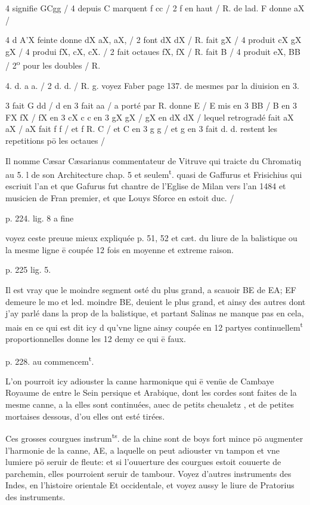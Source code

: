 \documentclass[11pt,a4paper]{article}
\begin{document}
4 signifie GCgg / 4 depuis C marquent f cc / 2 f en haut / R. de lad. F donne aX /

4 d A'X feinte donne dX aX, aX, / 2 font dX dX / R. fait gX / 4 produit cX gX gX / 4 produi fX, cX, cX. / 2 fait octaues fX, fX / R. fait B / 4 produit eX, BB / 2\textsuperscript{o} pour les doubles / R. \ill{}

4. d. a a. / 2 d. d. / R. g. voyez Faber page 137. de mesmes par la diuision en 3.

3 fait G dd / d en 3 fait aa / a porté par R. donne E / E mis en 3 BB / B en 3 FX fX / fX en 3 cX c\ill{} c en 3 gX gX / gX en  dX dX / lequel retrogradé fait aX aX / aX fait f f / et f R. C / et C en 3 g g / et g en 3 fait d. d. restent les repetitions pō les octaues /

Il nomme Cæsar Cæsarianus commentateur de Vitruve qui traicte du Chromatiq au 5. l de son Architecture chap. 5 et  seulem\textsuperscript{t}. quasi de Gaffurus et Frisichius qui escriuit l'an \ill{} et que Gafurus fut chantre de l'Eglise de Milan vers l'an 1484 et musicien de Fran\ill{} premier, et que Louys Sforce en estoit duc. /

p. 224. lig. 8 a fine

voyez ceste preuue mieux expliquée p. 51, 52 et cæt. du liure de la balistique ou la mesme ligne ē coupée 12 fois en moyenne et extreme raison.

p. 225 lig. 5.

Il est vray que le moindre segment osté du plus grand, a scauoir BE de EA; EF demeure le mo\ill{} et led. moindre BE, deuient le plus grand, et ainsy des autres dont j'ay parlé dans la prop\ill{} de la balistique, et partant Salinas ne manque pas en cela, mais en ce qui est dit icy d\ill{} qu'vne ligne ainsy coupée en 12 partyes continuellem\textsuperscript{t} proportionnelles donne les 12 demy\ill{} ce qui ē faux.

p. 228. au commencem\textsuperscript{t}.

L'on pourroit icy adiouster la canne harmonique qui ē venüe de Cambaye Royaume de \ill{} entre le Sein persique et Arabique, dont les cordes sont faites de la mesme canne, a la\ill{} elles sont continuées, auec de petits cheualetz \ill{}, et de petites mortaises dessous, d'ou elles ont esté tirées.

Ces grosses courgues instrum\textsuperscript{ts}. de la chine sont de boys fort mince pō augmenter l'harmonie de la canne, AE, a laquelle on peut adiouster vn tampon et vne lumiere pō seruir de fleute: et si l'ouuerture des courgues estoit couuerte de parchemin, elles pourroient seruir de tambour. Voyez d'autres instruments des Indes, en l'histoire orientale Et occidentale, et voyez aussy le liure de Pratorius des instruments.
\end{document}
